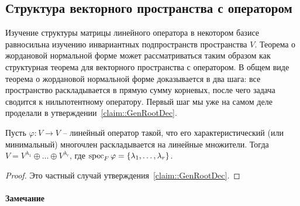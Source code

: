 \subsection{Структура векторного пространства с оператором}

Изучение структуры матрицы линейного оператора в некотором базисе равносильна изучению инвариантных подпространств пространства $V$.
Теорема о жордановой нормальной форме может рассматриваться таким образом как структурная теорема для векторного пространства с оператором.
В общем виде теорема о жордановой нормальной форме доказывается в два шага: все пространство раскладывается в прямую сумму корневых, после чего задача сводится к нильпотентному оператору.
Первый шаг мы уже на самом деле проделали в утверждении~\ref{claim::GenRootDec}.

\begin{claim}
\label{claim::RootSpaceDec}
Пусть $\varphi\colon V\to V$ -- линейный оператор такой, что его характеристический (или минимальный) многочлен раскладывается на линейные множители.
Тогда $V = V^{\lambda_1} \oplus \ldots\oplus V^{\lambda_r}$, где $\operatorname{spec}_F \varphi = \{\lambda_1,\ldots, \lambda_r\}$.
\end{claim}
\begin{proof}
Это частный случай утверждения~\ref{claim::GenRootDec}.
\end{proof}

\paragraph{Замечание}

